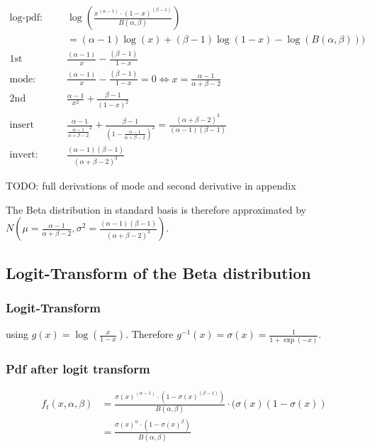 \documentclass{article}
\begin{document}
\begin{align*}
\text{log-pdf: } &\log\left( \frac{x^{(\alpha - 1)} \cdot (1-x)^{(\beta-1)}}{B(\alpha, \beta)} \right) \\
&= (\alpha-1) \log(x) + (\beta-1)\log(1-x) - \log(B(\alpha,\beta)))\\
\text{1st derivative: }& \frac{(\alpha-1)}{x} - \frac{(\beta-1)}{1-x}  \\
\text{mode: }& \frac{(\alpha-1)}{x} - \frac{(\beta-1)}{1-x}  = 0 \Leftrightarrow x = \frac{\alpha-1}{\alpha + \beta - 2} \\
\text{2nd derivative: }& \frac{\alpha -1}{x^2} + \frac{\beta - 1}{(1 - x)^2} \\
\text{insert mode: }& \frac{\alpha -1}{\frac{\alpha-1}{\alpha + \beta - 2}^2} + \frac{\beta - 1}{(1 - \frac{\alpha-1}{\alpha + \beta - 2})^2} = \frac{(\alpha + \beta - 2)^3}{(\alpha-1)(\beta-1)}\\
\text{invert: }& \frac{(\alpha -1)(\beta-1)}{(\alpha + \beta - 2)^3}
\end{align*}

TODO: full derivations of mode and second derivative in appendix

The Beta distribution in standard basis is therefore approximated by $N(\mu = \frac{\alpha-1}{\alpha + \beta - 2}, \sigma^2 = \frac{(\alpha -1)(\beta-1)}{(\alpha + \beta - 2)^3})$.

\subsection{Logit-Transform of the Beta distribution}

\subsubsection{Logit-Transform}

using $g(x) = \log(\frac{x}{1-x})$. Therefore $g^{-1}(x) = \sigma(x) = \frac{1}{1+ \exp(-x)}$. 

\subsubsection{Pdf after logit transform}

\begin{align*}
	f_t(x, \alpha, \beta) &= \frac{\sigma(x)^{(\alpha - 1)} \cdot (1 - \sigma(x)^{(\beta -1)})}{B(\alpha, \beta)} \cdot (\sigma(x)(1-\sigma(x)) \\
	&=  \frac{\sigma(x)^{\alpha} \cdot (1 - \sigma(x)^{\beta})}{B(\alpha, \beta)}
\end{align*}
\end{document}
